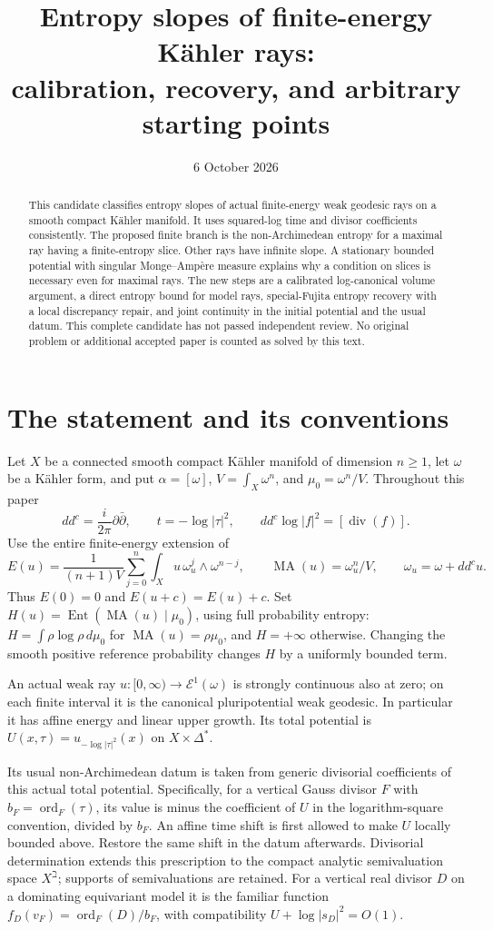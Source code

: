 \documentclass[11pt]{article}
\title{Entropy slopes of finite-energy K\"ahler rays:\\
calibration, recovery, and arbitrary starting points}
\author{}
\date{6 October 2026}
\newcommand{\MA}{\operatorname{MA}}
\newcommand{\Ent}{\operatorname{Ent}}
\newcommand{\ord}{\operatorname{ord}}
\begin{document}
\maketitle
\begin{abstract}
This candidate classifies entropy slopes of actual finite-energy weak
geodesic rays on a smooth compact K\"ahler manifold. It uses squared-log
time and divisor coefficients consistently. The proposed finite branch
is the non-Archimedean entropy for a maximal ray having a finite-entropy
slice. Other rays have infinite slope. A stationary bounded potential
with singular Monge--Amp\`ere measure explains why a condition on slices
is necessary even for maximal rays. The new steps are a calibrated
log-canonical volume argument, a direct entropy bound for model rays,
special-Fujita entropy recovery with a local discrepancy repair, and
joint continuity in the initial potential and the usual datum.
This complete candidate has not passed independent review. No original
problem or additional accepted paper is counted as solved by this text.
\end{abstract}

\section{The statement and its conventions}
Let $X$ be a connected smooth compact K\"ahler manifold of dimension
$n\geq1$, let $\omega$ be a K\"ahler form, and put
$\alpha=[\omega]$, $V=\int_X\omega^n$, and $\mu_0=\omega^n/V$.
Throughout this paper
\[
 dd^c=\frac{i}{2\pi}\partial\bar\partial,
 \qquad t=-\log|\tau|^2,
 \qquad dd^c\log|f|^2=[\operatorname{div}(f)].                 \tag{1}
\]
Use the entire finite-energy extension of
\[
 E(u)=\frac1{(n+1)V}\sum_{j=0}^n
          \int_Xu\,\omega_u^j\wedge\omega^{n-j},\qquad
 \MA(u)=\omega_u^n/V,\qquad \omega_u=\omega+dd^cu.
\]
Thus $E(0)=0$ and $E(u+c)=E(u)+c$. Set
$H(u)=\Ent(\MA(u)\mid\mu_0)$, using full probability entropy:
$H=\int\rho\log\rho\,d\mu_0$ for $\MA(u)=\rho\mu_0$,
and $H=+\infty$ otherwise. Changing the smooth positive reference
probability changes $H$ by a uniformly bounded term.

An actual weak ray $u:[0,\infty)\to\mathcal E^1(\omega)$ is strongly
continuous also at zero; on each finite interval it is the canonical
pluripotential weak geodesic. In particular it has affine energy and
linear upper growth. Its total potential is
$U(x,\tau)=u_{-\log|\tau|^2}(x)$ on $X\times\Delta^*$.

Its usual non-Archimedean datum is taken from generic divisorial
coefficients of this actual total potential. Specifically, for a
vertical Gauss divisor $F$ with $b_F=\ord_F(\tau)$, its value is minus
the coefficient of $U$ in the logarithm-square convention, divided by
$b_F$. An affine time shift is first allowed to make $U$ locally bounded
above. Restore the same shift in the datum afterwards. Divisorial
determination extends this prescription to the compact analytic
semivaluation space $X^\beth$; supports of semivaluations are retained.
For a vertical real divisor $D$ on a dominating equivariant model it is
the familiar function
$f_D(v_F)=\ord_F(D)/b_F$, with compatibility
$U+\log|s_D|^2=O(1)$.
\end{document}
